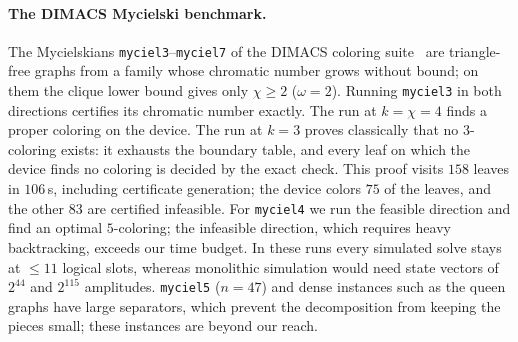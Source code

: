 \documentclass[a4paper,fleqn]{cas-sc}
\begin{document}
\paragraph{The DIMACS Mycielski benchmark.}
\label{sec:dimacs}
The Mycielskians \texttt{myciel3}--\texttt{myciel7} of the DIMACS coloring
suite~\cite{JohnsonTrick1996} are triangle-free graphs from a family whose chromatic
number grows without bound; on them the clique lower bound gives only $\chi\ge2$
($\omega=2$). Running \texttt{myciel3} in both directions certifies its chromatic
number exactly. The run at $k=\chi=4$ finds a proper coloring on the device. The run
at $k=3$ proves classically that no $3$-coloring exists: it exhausts the boundary
table, and every leaf on which the device finds no coloring is decided by the exact
check. This proof visits $158$ leaves in $106$\,s, including certificate generation;
the device colors $75$ of the leaves, and the other $83$ are certified infeasible. For
\texttt{myciel4} we run the feasible direction and find an optimal $5$-coloring; the
infeasible direction, which requires heavy backtracking, exceeds our time budget. In
these runs every simulated solve stays at $\le11$ logical slots, whereas monolithic
simulation would need state vectors of $2^{44}$ and $2^{115}$ amplitudes.
\texttt{myciel5} ($n=47$) and dense instances such as the queen graphs have large
separators, which prevent the decomposition from keeping the pieces small; these
instances are beyond our reach.
\end{document}
